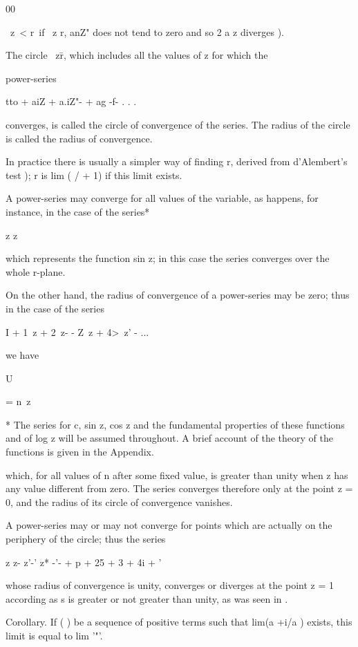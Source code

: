 00

\ z\ < r\ if \ z r, anZ" does not tend to zero and so 2 a z diverges
).

The circle \ z\=r, which includes all the values of z for which the

power-series

tto + aiZ + a.iZ"- + ag -f- . . .

converges, is called the circle of convergence of the series. The
radius of the circle is called the radius of convergence.

In practice there is usually a simpler way of finding r, derived from
d'Alembert's test ); r is lim ( / + 1) if this limit exists.

A power-series may converge for all values of the variable, as
happens, for instance, in the case of the series*

z z

which represents the function sin z; in this case the series
converges over the whole r-plane.

On the other hand, the radius of convergence of a power-series may be
zero; thus in the case of the series

I + 1\ z + 2\ z- - Z\ z + 4>\ z' - ...

we have

U

= n\ z

* The series for c, sin z, cos z and the fundamental properties of
these functions and of log z will be assumed throughout. A brief
account of the theory of the functions is given in the Appendix.

%
%

which, for all values of n after some fixed value, is greater than
unity when z has any value different from zero. The series converges
therefore only at the point z = 0, and the radius of its circle of
convergence vanishes.

A power-series may or may not converge for points which are actually
on the periphery of the circle; thus the series

z z- z'-' z* -'- + p + 25 + 3 + 4i +   '

whose radius of convergence is unity, converges or diverges at the
point z = 1 according as s is greater or not greater than unity, as
was seen in .

Corollary. If ( ) be a sequence of positive terms such that lim(a +i/a
) exists, this limit is equal to lim '"'.

